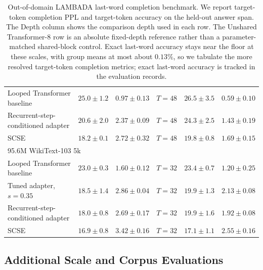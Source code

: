 \documentclass[letterpaper]{article} %
\newcommand{\SCSE}{\textsc{SCSE}}
\theoremstyle{remark}
\begin{document}
\begin{table}[t!]
\begin{tabular}{lrrcrr}
		Looped Transformer baseline                   & $25.0\pm1.2$              & $0.97\pm0.13$                                 & $T=48$  & $26.5\pm3.5$            & $0.59\pm0.10$          \\
		Recurrent-step-conditioned adapter            & $20.6\pm2.0$              & $2.37\pm0.09$                                 & $T=48$  & $24.3\pm2.5$            & $1.43\pm0.19$          \\
		\SCSE{}                                       & $\mathbf{18.2\pm0.1}$     & $\mathbf{2.72\pm0.32}$                        & $T=48$  & $\mathbf{19.8\pm0.8}$   & $\mathbf{1.69\pm0.15}$ \\
		\midrule
		\multicolumn{6}{l}{95.6M WikiText-103 5k}                                                                                                                                              \\
		Looped Transformer baseline                   & $23.0\pm0.3$              & $1.60\pm0.12$                                 & $T=32$  & $23.4\pm0.7$            & $1.20\pm0.25$          \\
		Tuned adapter, $s=0.35$                       & $18.5\pm1.4$              & $2.86\pm0.04$                                 & $T=32$  & $19.9\pm1.3$            & $2.13\pm0.08$          \\
		Recurrent-step-conditioned adapter            & $18.0\pm0.8$              & $2.69\pm0.17$                                 & $T=32$  & $19.9\pm1.6$            & $1.92\pm0.08$          \\
		\SCSE{}                                       & $\mathbf{16.9\pm0.8}$     & $\mathbf{3.42\pm0.16}$                        & $T=32$  & $\mathbf{17.1\pm1.1}$   & $\mathbf{2.55\pm0.16}$ \\
		\bottomrule
	\end{tabular}
	\caption{Out-of-domain LAMBADA last-word completion benchmark.  We report target-token completion PPL and target-token accuracy on the held-out answer span.  The Depth column shows the comparison depth used in each row.  The Unshared Transformer-8 row is an absolute fixed-depth reference rather than a parameter-matched shared-block control.  Exact last-word accuracy stays near the floor at these scales, with group means at most about $0.13\%$, so we tabulate the more resolved target-token completion metrics; exact last-word accuracy is tracked in the evaluation records.}
	\label{tab:lambada}
\end{table}

\subsection{Additional Scale and Corpus Evaluations}
\label{app:additional-scale-corpus}
\end{document}
